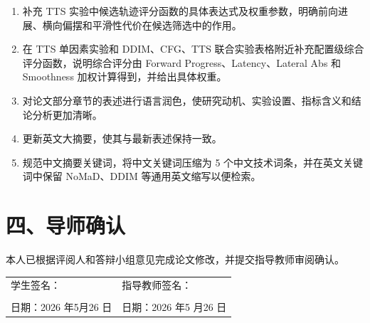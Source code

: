 \documentclass[UTF8,zihao=-4]{ctexart}
\begin{document}
\begin{enumerate}[label=\arabic*.]
    \item 补充 TTS 实验中候选轨迹评分函数的具体表达式及权重参数，明确前向进展、横向偏摆和平滑性代价在候选筛选中的作用。
    \item 在 TTS 单因素实验和 DDIM、CFG、TTS 联合实验表格附近补充配置级综合评分函数，说明综合评分由 Forward Progress、Latency、Lateral Abs 和 Smoothness 加权计算得到，并给出具体权重。
    \item 对论文部分章节的表述进行语言润色，使研究动机、实验设置、指标含义和结论分析更加清晰。
    \item 更新英文大摘要，使其与最新表述保持一致。
    \item 规范中文摘要关键词，将中文关键词压缩为 5 个中文技术词条，并在英文关键词中保留 NoMaD、DDIM 等通用英文缩写以便检索。
\end{enumerate}

\section*{四、导师确认}

本人已根据评阅人和答辩小组意见完成论文修改，并提交指导教师审阅确认。

\vspace{2em}

\begin{tabular}{p{6cm}p{6cm}}
学生签名： & 指导教师签名： \\
\vspace{2em} & \vspace{2em} \\
日期：2026 年5月26 日 & 日期：2026 年5 月26 日 \\
\end{tabular}
\end{document}
